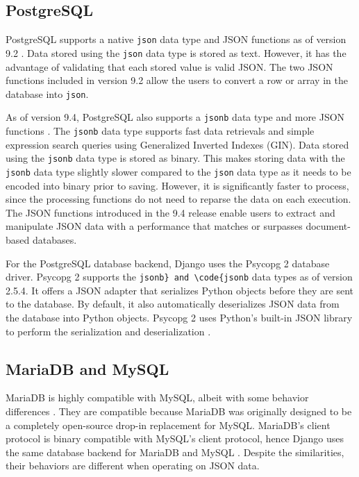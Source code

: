 \subsection{PostgreSQL}

PostgreSQL supports a native \verb|json| data type and JSON functions as of
version 9.2 \cite{postgresql:9.2}. Data stored using the \verb|json| data type
is stored as text. However, it has the advantage of validating that each stored
value is valid JSON. The two JSON functions included in version 9.2 allow the
users to convert a row or array in the database into \verb|json|.

As of version 9.4, PostgreSQL also supports a \verb|jsonb| data type and more
JSON functions \cite{postgresql:9.4}. The \verb|jsonb| data type supports fast
data retrievals and simple expression search queries using Generalized Inverted
Indexes (GIN). Data stored using the \verb|jsonb| data type is stored as
binary. This makes storing data with the \verb|jsonb| data type slightly slower
compared to the \verb|json| data type as it needs to be encoded into binary
prior to saving. However, it is significantly faster to process, since the
processing functions do not need to reparse the data on each execution. The
JSON functions introduced in the 9.4 release enable users to extract and
manipulate JSON data with a performance that matches or surpasses
document-based databases.

For the PostgreSQL database backend, Django uses the Psycopg 2 database driver.
Psycopg 2 supports the \verb|jsonb} and \code{jsonb| data types as of version
2.5.4. It offers a JSON adapter that serializes Python objects before they are
sent to the database. By default, it also automatically deserializes JSON data
from the database into Python objects. Psycopg 2 uses Python's built-in JSON
library to perform the serialization and deserialization
\cite{psycopg2:json-adaptation}.

\subsection{MariaDB and MySQL}

MariaDB is highly compatible with MySQL, albeit with some behavior differences
\cite{mariadb:compatibility}. They are compatible because MariaDB was
originally designed to be a completely open-source drop-in replacement for
MySQL. MariaDB's client protocol is binary compatible with MySQL's client
protocol, hence Django uses the same database backend for MariaDB and MySQL
\cite{django:databases}. Despite the similarities, their behaviors are
different when operating on JSON data.

